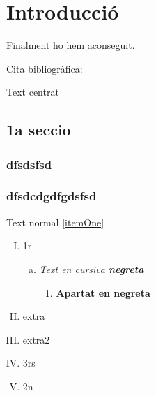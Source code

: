 \documentclass[a4paper,12pt]{book}
\renewcommand{\headrulewidth}{0pt}
\begin{document}


\frontmatter

\cleardoublepage

% 

\cleardoublepage
\setcounter{tocdepth}{2}
\renewcommand\contentsname{Índex de continguts}
\tableofcontents
\label{i:tableofcontents}

\mainmatter
\pagestyle{fancy}
\fancyhf{}
\fancyhead[LE,RO]{\leftmark}
\fancyfoot[LE,RO]{\thepage}
\renewcommand{\headrulewidth}{2pt}
\renewcommand{\footrulewidth}{1pt}

% 
\chapter{Introducció}

Finalment ho hem aconseguit.

Cita bibliogràfica: \cite{TP} \cite{GNU-ca}


\begin{center}
  Text centrat
\end{center}

\section{1a seccio}

\subsection{dfsdsfsd}
\subsection{dfsdcdgdfgdsfsd}

Text normal \ref{itemOne}

\begin{enumerate}[(I)]
 \item 1r
 \begin{enumerate}[a)]
  \item \textit{Text en cursiva \textbf{negreta}}
  \begin{enumerate} [1)]
   \item \textbf{Apartat en negreta}
  \end{enumerate}

 \end{enumerate}
 \item extra
 \item extra2
 \item\label{itemOne} 3rs
 \item 2n
\end{enumerate}
\end{document}
